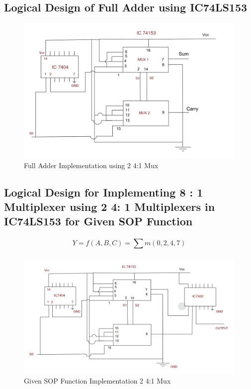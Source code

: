 \documentclass[11pt]{article}
\begin{document}
\subsection{Logical Design of Full Adder using IC74LS153}
\vfill
\begin{figure}[H]
	\centering
	\includegraphics[scale = 0.6]{full adder.png}
	\caption{Full Adder Implementation using 2 4:1 Mux}
\end{figure}

\vfill
\pagebreak
\subsection{Logical Design for Implementing 8 : 1 Multiplexer using 2 4: 1 Multiplexers in IC74LS153 for Given SOP Function}
$$
	Y = f(A, B, C) = \displaystyle\sum_{}^{} m(0, 2, 4, 7)
$$
\vfill
\begin{figure}[H]
	\centering
	\includegraphics[scale = 0.5]{function implementation using 2 mux.png}
	\caption{Given SOP Function Implementation 2 4:1 Mux}
\end{figure}
\vfill
\pagebreak
\end{document}
